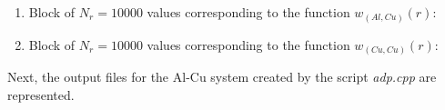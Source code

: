 \documentclass{article}
\begin{document}
\begin{enumerate}
\begin{enumerate}
			\item Block of $N_r=10000$ values corresponding to the function $w_{(Al,Cu)}(r)$:
			
			\item Block of $N_r=10000$ values corresponding to the function $w_{(Cu,Cu)}(r)$:
		\end{enumerate}
	\end{enumerate}

Next, the output files for the Al-Cu system created by the script \textit{adp.cpp} are represented.
\end{document}
